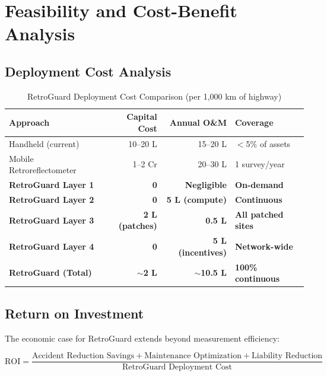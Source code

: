 \documentclass[11pt,a4paper]{article}
\begin{document}
\section{Feasibility and Cost-Benefit Analysis}
\label{sec:feasibility}

\subsection{Deployment Cost Analysis}

\begin{table}[H]
\centering
\caption{RetroGuard Deployment Cost Comparison (per 1,000 km of highway)}
\label{tab:cost_analysis}
\begin{tabular}{@{}p{4cm}rrl@{}}
\toprule
\textbf{Approach} & \textbf{Capital Cost} & \textbf{Annual O\&M} & \textbf{Coverage} \\
\midrule
Handheld (current) & 10--20 L & 15--20 L & $<$5\% of assets \\
Mobile Retroreflectometer & 1--2 Cr & 20--30 L & 1 survey/year \\
\midrule
\textbf{RetroGuard Layer 1} & \textbf{0} & \textbf{Negligible} & \textbf{On-demand} \\
\textbf{RetroGuard Layer 2} & \textbf{0} & \textbf{5 L (compute)} & \textbf{Continuous} \\
\textbf{RetroGuard Layer 3} & \textbf{2 L (patches)} & \textbf{0.5 L} & \textbf{All patched sites} \\
\textbf{RetroGuard Layer 4} & \textbf{0} & \textbf{5 L (incentives)} & \textbf{Network-wide} \\
\textbf{RetroGuard (Total)} & \textbf{$\sim$2 L} & \textbf{$\sim$10.5 L} & \textbf{100\% continuous} \\
\bottomrule
\end{tabular}
\end{table}

\subsection{Return on Investment}

The economic case for RetroGuard extends beyond measurement efficiency:

\begin{equation}
\text{ROI} = \frac{\text{Accident Reduction Savings} + \text{Maintenance Optimization} + \text{Liability Reduction}}{\text{RetroGuard Deployment Cost}}
\label{eq:roi}
\end{equation}
\end{document}
